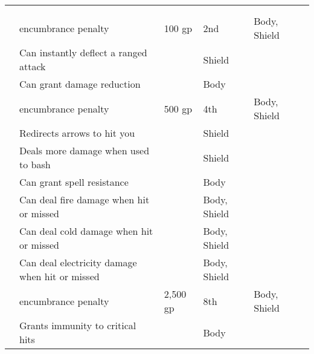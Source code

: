         \begin{longtabuwrapper}
            \begin{longtabu}{l X l l l l}
                \\
                 &  &  &  &  &  \\
                  &  encumbrance penalty & 100 gp & 2nd & Body, Shield &  \\
                 & Can instantly deflect a ranged attack &  & Shield &  \\
                 & Can grant damage reduction &  & Body &  \\
                  &  encumbrance penalty & 500 gp & 4th & Body, Shield &  \\
                 & Redirects arrows to hit you &  & Shield &  \\
                 & Deals more damage when used to bash &  & Shield &  \\
                 & Can grant spell resistance &  & Body &  \\
                 & Can deal fire damage when hit or missed &  & Body, Shield &  \\
                 & Can deal cold damage when hit or missed &  & Body, Shield &  \\
                 & Can deal electricity damage when hit or missed &  & Body, Shield &  \\
                  &  encumbrance penalty & 2,500 gp & 8th & Body, Shield &  \\
                 & Grants immunity to critical hits &  & Body &  \\

\end{longtabu}
\end{longtabuwrapper}
